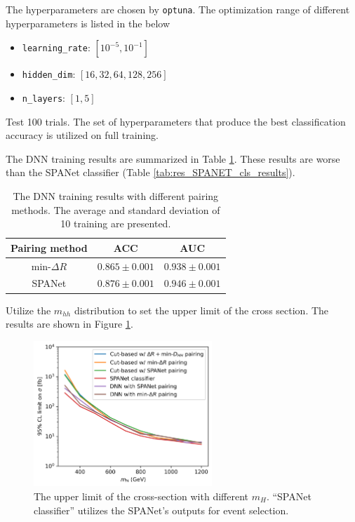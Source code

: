 \documentclass[12pt]{article}
\begin{document}
		The hyperparameters are chosen by \verb|optuna|. The optimization range of different hyperparameters is listed in the below
		\begin{itemize}
			\item \verb+learning_rate+: $[10^{-5}, 10^{-1}]$ 
			\item \verb+hidden_dim+: $[16,32,64,128,256]$ 
			\item \verb+n_layers+: $[1,5]$ 
		\end{itemize}
		Test 100 trials. The set of hyperparameters that produce the best classification accuracy is utilized on full training.

		The DNN training results are summarized in Table \ref{tab:DNN_results}. These results are worse than the SPANet classifier (Table \ref{tab:res_SPANET_cls_results}).
		\begin{table}[htpb]
			\centering
			\caption{The DNN training results with different pairing methods. The average and standard deviation of 10 training are presented.}
			\label{tab:DNN_results}
			\begin{tabular}{c|cc}
			Pairing method        & ACC     & AUC   \\ \hline
			$\text{min-}\Delta R$ & $0.865 \pm 0.001$ & $0.938 \pm 0.001$ \\
			SPANet                & $0.876 \pm 0.001$ & $0.946 \pm 0.001$ \\
			\end{tabular}      
		\end{table}

		Utilize the $m_{hh}$ distribution to set the upper limit of the cross section. The results are shown in Figure \ref{fig:CL_limit_DNN}.
		\begin{figure}[htpb]
			\centering
			\includegraphics[width=0.6\textwidth]{CLs_upper_limit_DNN.png}
			\caption{The upper limit of the cross-section with different $m_H$. ``SPANet classifier'' utilizes the SPANet's outputs for event selection.}
			\label{fig:CL_limit_DNN}
		\end{figure}
\end{document}
